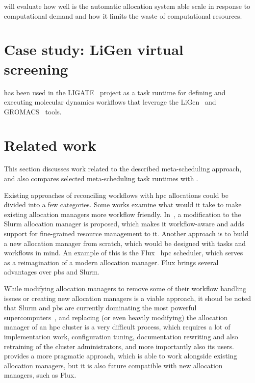  will evaluate how well is the automatic allocation system able
scale in response to computational demand and how it limits the waste of computational resources.

\section{Case study: LiGen virtual screening}
\hyperqueue{} has been used in the LIGATE~\cite{ligate} project as a task runtime for defining and executing molecular
dynamics workflows that leverage the LiGen~\cite{TODO} and GROMACS~\cite{TODO} tools.

\section{Related work}
\label{hq:related-work}
This section discusses work related to the described meta-scheduling approach, and also compares
selected meta-scheduling task runtimes with \hyperqueue{}.

Existing approaches of reconciling workflows with \gls{hpc} allocations could be divided into a
few categories. Some works examine what would it take to make existing allocation managers more
workflow friendly. In~\cite{slurm-workflow}, a modification to the Slurm allocation manager is
proposed, which makes it workflow-aware and adds support for fine-grained resource management to it.
Another approach is to build a new allocation manager from scratch, which would be designed with
tasks and workflows in mind. An example of this is the Flux~\cite{flux} \gls{hpc} scheduler,
which serves as a reimagination of a modern allocation manager. Flux brings several advantages
over \gls{pbs} and Slurm.

While modifying allocation managers to remove some of their workflow handling issues or creating
new allocation managers is a viable approach, it shoud be noted that Slurm and \gls{pbs} are
currently dominating the most powerful supercomputers~\cite{slurm-schedmd}, and replacing (or
even heavily modifying) the allocation manager of an \gls{hpc}
cluster is a very difficult process, which requires a lot of implementation work, configuration
tuning, documentation rewriting and also retraining of the cluster administrators, and more
importantly also its users. \hyperqueue{} provides a more pragmatic approach, which is able to
work alongside existing allocation managers, but it is also future compatible with new allocation
managers, such as Flux.

